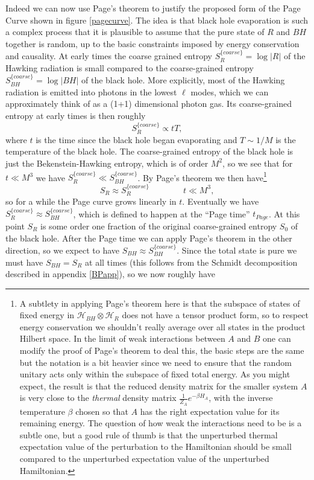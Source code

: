\documentclass[12pt]{article}
\newcommand{\be}{\begin{equation}}
\newcommand{\ee}{\end{equation}}
\newcommand{\HR}{\mathcal{H}_R}
\begin{document}
Indeed we can now use Page's theorem to justify the proposed form of the Page Curve shown in figure \ref{pagecurve}.  The idea is that black hole evaporation is such a complex process that it is plausible to assume that the pure state of $R$ and $BH$ together is random, up to the basic constraints imposed by energy conservation and causality.  At early times the coarse grained entropy $S_R^{\{coarse\}}=\log|R|$ of the Hawking radiation is small compared to the coarse-grained entropy $S_{BH}^{\{coarse\}}=\log|BH|$ of the black hole.  More explicitly, most of the Hawking radiation is emitted into photons in the lowest $\ell$ modes, which we can approximately think of as a (1+1) dimensional photon gas.  Its coarse-grained entropy at early times is then roughly
\be
S_R^{\{coarse\}}\propto t T,
\ee  
where $t$ is the time since the black hole began evaporating and $T\sim 1/M$ is the temperature of the black hole.  The coarse-grained entropy of the black hole is just the Bekenstein-Hawking entropy, which is of order $M^2$, so we see that for $t\ll M^3$ we have $S_R^{\{coarse\}}\ll S_{BH}^{\{coarse\}}$.  By Page's theorem we then have\footnote{A subtlety in applying Page's theorem here is that the subspace of states of fixed energy in $\mathcal{H}_{BH}\otimes \HR$ does not have a tensor product form, so to respect energy conservation we shouldn't really average over all states in the product Hilbert space.  In the limit of weak interactions between $A$ and $B$ one can modify the proof of Page's theorem to deal this, the basic steps are the same but the notation is a bit heavier since we need to ensure that the random unitary acts only within the subspace of fixed total energy.  As you might expect, the result is  that the reduced density matrix for the smaller system $A$ is very close to the \textit{thermal} density matrix $\frac{1}{Z_A}e^{-\beta H_A}$, with the inverse temperature $\beta$ chosen so that $A$ has the right expectation value for its remaining energy.  The question of how weak the interactions need to be is a subtle one, but a good rule of thumb is that the unperturbed thermal expectation value of the perturbation to the Hamiltonian should be small compared to the unperturbed expectation value of the unperturbed Hamiltonian.}
\be
S_R\approx S_R^{\{coarse\}}\qquad \qquad t\ll M^3,
\ee
so for a while the Page curve grows linearly in $t$.  Eventually we have $S_R^{\{coarse\}}\approx S_{BH}^{\{coarse\}}$, which is defined to happen at the ``Page time'' $t_{Page}$.  At this point $S_R$ is some order one fraction of the original coarse-grained entropy $S_0$ of the black hole.  After the Page time we can apply Page's theorem in the other direction, so we expect to have $S_{BH}\approx S_{BH}^{\{coarse\}}$. Since the total state is pure we must have $S_{BH}=S_{R}$ at all times (this follows from the Schmidt decomposition described in appendix \ref{BPapp}), so we now roughly have 
\end{document}
